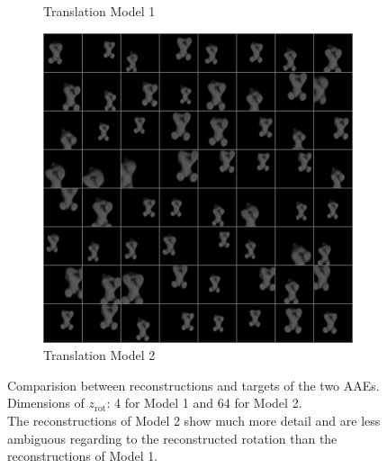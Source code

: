 \documentclass[10pt,a4paper]{article}
\newcommand{\rot}{\ensuremath{\text{rot}\xspace}}
\begin{document}
\begin{figure}[!ht]
\begin{subfigure}{0.3\textwidth}
	\caption{Translation Model 1}
	\label{cat_trec}
\end{subfigure}
\begin{subfigure}{0.3\textwidth}
	\centering	
	\includegraphics[width=\textwidth]{cat_64_output1.png}
	\caption{Translation Model 2}
	\label{cat_trec1}
\end{subfigure}
\caption{Comparision between reconstructions and targets of the two AAEs. 
Dimensions of $z_{\rot}$: 4 for Model 1 and 64 for Model 2.\\
The reconstructions of Model 2 show much more detail and are less ambiguous regarding to the reconstructed rotation than the reconstructions of Model 1.} \label{cat_images}
\end{figure}

\newpage
\end{document}
